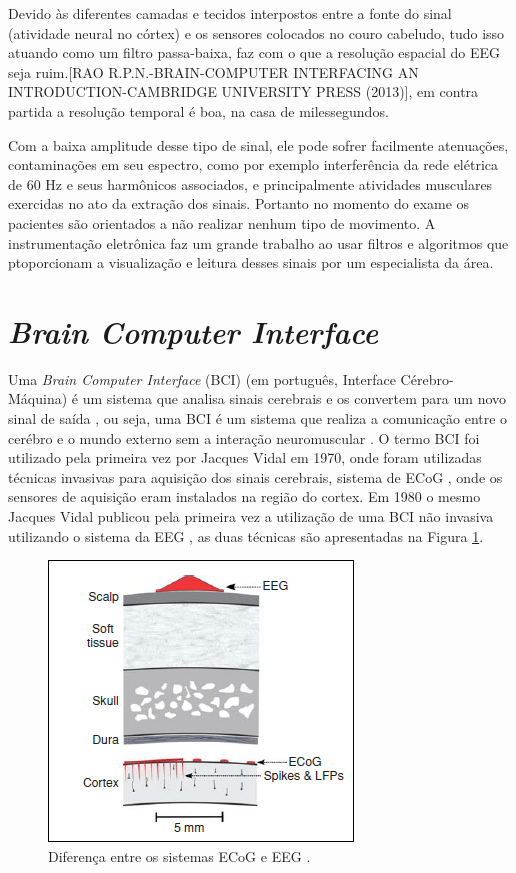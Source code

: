 Devido às diferentes camadas e tecidos interpostos entre a fonte do sinal
 (atividade neural no córtex) e os sensores colocados no couro cabeludo,
 tudo isso atuando como um filtro passa-baixa, faz com o que a resolução
 espacial do EEG seja ruim.[RAO R.P.N.-BRAIN-COMPUTER INTERFACING AN
 INTRODUCTION-CAMBRIDGE UNIVERSITY PRESS (2013)], em contra partida a
 resolução temporal é boa, na casa de milessegundos.

Com a baixa amplitude desse tipo de sinal, ele pode sofrer facilmente
 atenuações, contaminações em seu espectro, como por exemplo interferência
 da rede elétrica de 60 Hz e seus harmônicos associados, e principalmente
 atividades musculares exercidas no ato da extração dos sinais. Portanto
 no momento do exame os pacientes são orientados a não realizar nenhum
 tipo de movimento. A instrumentação eletrônica faz um grande trabalho
 ao usar filtros e algoritmos que ptoporcionam a visualização e leitura
 desses sinais por um especialista da área.

\section{\textit{Brain Computer Interface}}

Uma \textit{Brain Computer Interface} (BCI) (em português, Interface Cérebro-Máquina) é um sistema que analisa sinais cerebrais e os convertem para um novo sinal de saída \cite{BCIWolpaw}, ou seja, uma BCI é um sistema que realiza a comunicação entre o cerébro e o mundo externo sem a interação neuromuscular \cite{BCIWolpaw}.
O termo BCI foi utilizado pela primeira vez por Jacques Vidal em 1970, onde foram utilizadas técnicas invasivas para aquisição dos sinais cerebrais, sistema de ECoG \cite{BCIWolpaw}, onde os sensores de aquisição eram instalados na região do cortex. Em 1980 o mesmo Jacques Vidal publicou pela primeira vez a utilização de uma BCI não invasiva utilizando o sistema da EEG \cite{CristophBCI}, as duas técnicas são apresentadas na Figura \ref{ECoGeEEG}.

\begin{figure}[h]
	\centering
	\includegraphics[keepaspectratio=true,scale=1.0]{figuras/sistemas_de_aquisicao.PNG}
	\caption{Diferença entre os sistemas ECoG e EEG \cite{BCIWolpaw}.}
	\label{ECoGeEEG}
\end{figure}

